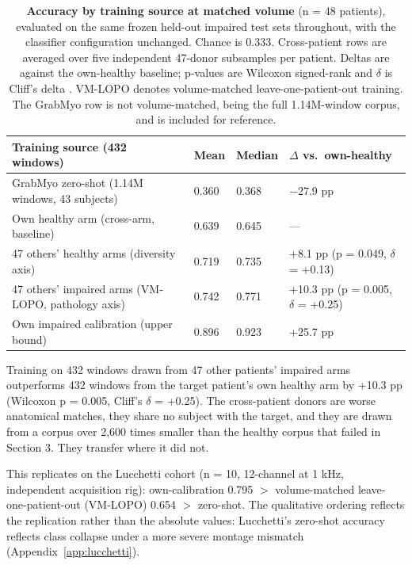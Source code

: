 \documentclass{article}
\begin{document}
\begin{table}[t]
  \caption{\textbf{Accuracy by training source at matched volume} (n = 48 patients), evaluated on the same frozen held-out impaired test sets throughout, with the classifier configuration unchanged. Chance is 0.333. Cross-patient rows are averaged over five independent 47-donor subsamples per patient. Deltas are against the own-healthy baseline; p-values are Wilcoxon signed-rank and $\delta$ is Cliff's delta \citep{cliff1993}. VM-LOPO denotes volume-matched leave-one-patient-out training. The GrabMyo row is not volume-matched, being the full 1.14M-window corpus, and is included for reference.}
  \label{tab:ladder}
  \centering
  \begin{tabular}{llll}
    \toprule
    Training source (432 windows) & Mean & Median & $\Delta$ vs.\ own-healthy \\
    \midrule
    GrabMyo zero-shot (1.14M windows, 43 subjects) & 0.360 & 0.368 & $-$27.9 pp \\
    Own healthy arm (cross-arm, baseline) & 0.639 & 0.645 & --- \\
    47 others' healthy arms (diversity axis) & 0.719 & 0.735 & +8.1 pp (p = 0.049, $\delta$ = +0.13) \\
    47 others' impaired arms (VM-LOPO, pathology axis) & 0.742 & 0.771 & +10.3 pp (p = 0.005, $\delta$ = +0.25) \\
    Own impaired calibration (upper bound) & 0.896 & 0.923 & +25.7 pp \\
    \bottomrule
  \end{tabular}
\end{table}

Training on 432 windows drawn from 47 other patients' impaired arms outperforms 432 windows from the target patient's own healthy arm by +10.3 pp (Wilcoxon p = 0.005, Cliff's $\delta$ = +0.25). The cross-patient donors are worse anatomical matches, they share no subject with the target, and they are drawn from a corpus over 2{,}600 times smaller than the healthy corpus that failed in Section 3. They transfer where it did not.

This replicates on the Lucchetti cohort (n = 10, 12-channel at 1 kHz, independent acquisition rig): own-calibration 0.795 $>$ volume-matched leave-one-patient-out (VM-LOPO) 0.654 $>$ zero-shot. The qualitative ordering reflects the replication rather than the absolute values: Lucchetti's zero-shot accuracy reflects class collapse under a more severe montage mismatch (Appendix~\ref{app:lucchetti}).
\end{document}
